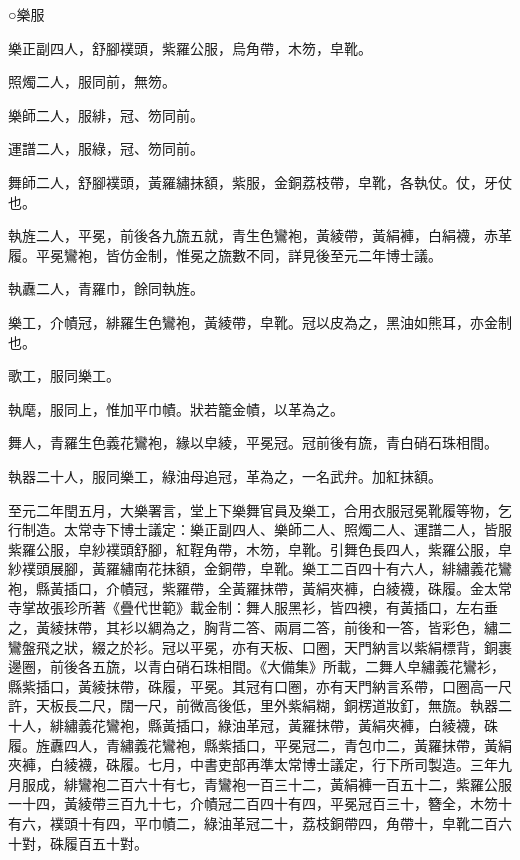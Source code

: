 
\begin{pinyinscope}

 ○樂服



 樂正副四人，舒腳襆頭，紫羅公服，烏角帶，木笏，皁靴。



 照燭二人，服同前，無笏。



 樂師二人，服緋，冠、笏同前。



 運譜二人，服綠，冠、笏同前。



 舞師二人，舒腳襆頭，黃羅繡抹額，紫服，金銅荔枝帶，皁靴，各執仗。仗，牙仗也。



 執旌二人，平冕，前後各九旒五就，青生色鸞袍，黃綾帶，黃絹褲，白絹襪，赤革履。平冕鸞袍，皆仿金制，惟冕之旒數不同，詳見後至元二年博士議。



 執纛二人，青羅巾，餘同執旌。



 樂工，介幘冠，緋羅生色鸞袍，黃綾帶，皁靴。冠以皮為之，黑油如熊耳，亦金制也。



 歌工，服同樂工。



 執麾，服同上，惟加平巾幘。狀若籠金幘，以革為之。



 舞人，青羅生色義花鸞袍，緣以皁綾，平冕冠。冠前後有旒，青白硝石珠相間。



 執器二十人，服同樂工，綠油母追冠，革為之，一名武弁。加紅抹額。



 至元二年閏五月，大樂署言，堂上下樂舞官員及樂工，合用衣服冠冕靴履等物，乞行制造。太常寺下博士議定：樂正副四人、樂師二人、照燭二人、運譜二人，皆服紫羅公服，皁紗襆頭舒腳，紅鞓角帶，木笏，皁靴。引舞色長四人，紫羅公服，皁紗襆頭展腳，黃羅繡南花抹額，金銅帶，皁靴。樂工二百四十有六人，緋繡義花鸞袍，縣黃插口，介幘冠，紫羅帶，全黃羅抹帶，黃絹夾褲，白綾襪，硃履。金太常寺掌故張珍所著《疊代世範》載金制：舞人服黑衫，皆四襖，有黃插口，左右垂之，黃綾抹帶，其衫以綢為之，胸背二答、兩肩二答，前後和一答，皆彩色，繡二鸞盤飛之狀，綴之於衫。冠以平冕，亦有天板、口圈，天門納言以紫絹標背，銅裹邊圈，前後各五旒，以青白硝石珠相間。《大備集》所載，二舞人皁繡義花鸞衫，縣紫插口，黃綾抹帶，硃履，平冕。其冠有口圈，亦有天門納言系帶，口圈高一尺許，天板長二尺，闊一尺，前微高後低，里外紫絹糊，銅楞道妝釘，無旒。執器二十人，緋繡義花鸞袍，縣黃插口，綠油革冠，黃羅抹帶，黃絹夾褲，白綾襪，硃履。旌纛四人，青繡義花鸞袍，縣紫插口，平冕冠二，青包巾二，黃羅抹帶，黃絹夾褲，白綾襪，硃履。七月，中書吏部再準太常博士議定，行下所司製造。三年九月服成，緋鸞袍二百六十有七，青鸞袍一百三十二，黃絹褲一百五十二，紫羅公服一十四，黃綾帶三百九十七，介幘冠二百四十有四，平冕冠百三十，簪全，木笏十有六，襆頭十有四，平巾幘二，綠油革冠二十，荔枝銅帶四，角帶十，皁靴二百六十對，硃履百五十對。




\end{pinyinscope}
